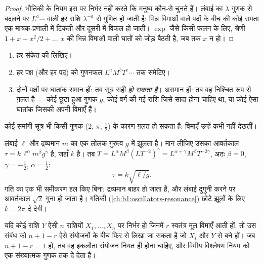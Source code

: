 \begin{proof}
भौतिकी के नियम इस पर निर्भर नहीं करते कि मनुष्य कौन-से  चुनते हैं।
लंबाई का  $\lambda$ गुणक से बदलने पर  $L^a \cdots$ वाली हर राशि
$\lambda^{-a}$ से गुणित हो जाती है: भिन्न विमाओं वाले पदों के बीच की कोई समता
एक मात्रक-प्रणाली में टिकती और दूसरी में विफल हो जाती। $\exp$ जैसे किसी फलन के
लिए, श्रेणी $1 + x + x^2/2 + \dots$ $x$ की भिन्न विमाओं वाली घातों को जोड़
बैठती है, जब तक $x$  न हो।
\end{proof}

\begin{method}[किसी सूत्र की जाँच]\label{met:b1:units-dimensions:check}
\begin{enumerate}
  \item हर संकेत की  लिखिए।
  \item हर पक्ष (और हर पद) को गुणनफल $L^a M^b T^c \cdots$ तक समेटिए।
  \item दोनों पक्षों पर घातांक समान हों: तब सूत्र सही \emph{हो सकता है}।
        असमान हों: तब वह निश्चित रूप से ग़लत है --- कोई छूटा हुआ गुणक $g$,
        कोई वर्ग की गई राशि जिसे सादा होना चाहिए था, या कोई ऐसा घातांक
        जिसकी अपनी विमाएँ हैं।
\end{enumerate}
कोई समांगी सूत्र भी किसी  गुणक ($2$, $\pi$, $\tfrac12$) के कारण ग़लत हो
सकता है: विमाएँ उन्हें कभी नहीं देखतीं।
\end{method}

\begin{example}[लोलक का आवर्तकाल]\label{ex:b1:units-dimensions:pendulum}
लंबाई $\ell$ और द्रव्यमान $m$ का एक लोलक गुरुत्व $g$ में झूलता है। मान लीजिए
उसका आवर्तकाल $\tau = k\,\ell^\alpha m^\beta g^\gamma$ है, जहाँ $k$ 
है। तब $T = L^\alpha M^\beta (L T^{-2})^\gamma =
L^{\alpha+\gamma} M^\beta T^{-2\gamma}$, अतः $\beta = 0$,
$\gamma = -\tfrac12$, $\alpha = \tfrac12$:
\[
\tau = k\sqrt{\ell/g} .
\]
गति का एक भी समीकरण हल किए बिना: द्रव्यमान बाहर हो जाता है, और लंबाई दुगुनी
करने पर आवर्तकाल $\sqrt2$ गुना हो जाता है। गतिकी
(\cref{ch:b1:oscillators-resonance}) छोटे झूलों के लिए $k = 2\pi$ दे देगी।
\end{example}

\begin{proposition}[विमाहीन समूह]\label{prop:b1:units-dimensions:pi}
यदि कोई राशि $Y$ ऐसी $n$ राशियों $X_1, \dots, X_n$ पर निर्भर हो जिनमें $r$
स्वतंत्र मूल विमाएँ आती हों, तो उस संबंध को $n + 1 - r$ ऐसे  संयोजनों
के बीच फिर से लिखा जा सकता है जो $X_i$ और $Y$ से बने हों। जब $n + 1 - r = 1$ हो, तब वह
इकलौता संयोजन नियत ही होना चाहिए, और विमीय विश्लेषण नियम को एक संख्यात्मक
गुणक तक दे देता है।
\end{proposition}
\admitted

